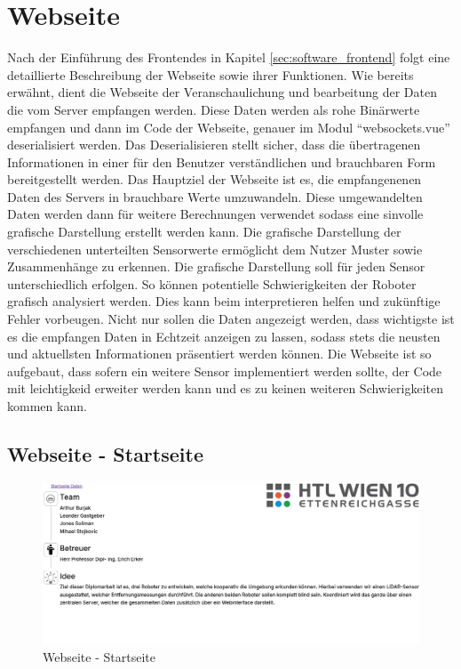 \section{Webseite}
\label{subsec:frontend_Webseite}
Nach der Einführung des Frontendes in Kapitel \ref{sec:software_frontend} folgt eine detaillierte
Beschreibung der Webseite sowie ihrer Funktionen. 
%
Wie bereits erwähnt, dient die Webseite der Veranschaulichung 
und bearbeitung der Daten die vom Server empfangen werden. 
%
Diese Daten werden als rohe Binärwerte empfangen und dann im Code der Webseite,
genauer im Modul ``websockets.vue'' deserialisiert werden. 
Das Deserialisieren stellt sicher, dass die übertragenen Informationen in einer für den Benutzer 
verständlichen und brauchbaren Form bereitgestellt werden. 
%
Das Hauptziel der Webseite ist es, die empfangenenen Daten des Servers in brauchbare Werte umzuwandeln. 
Diese umgewandelten Daten werden dann für weitere Berechnungen verwendet sodass eine sinvolle grafische Darstellung
erstellt werden kann.
%
Die grafische Darstellung der verschiedenen unterteilten Sensorwerte ermöglicht dem Nutzer Muster sowie 
Zusammenhänge zu erkennen. 
%
Die grafische Darstellung soll für jeden Sensor unterschiedlich erfolgen. So können potentielle Schwierigkeiten 
der Roboter grafisch analysiert werden. Dies kann beim interpretieren helfen und zukünftige Fehler vorbeugen. 
%
Nicht nur sollen die Daten angezeigt werden, dass wichtigste ist es die empfangen Daten 
in Echtzeit anzeigen zu lassen, sodass stets die neusten und aktuellsten Informationen präsentiert werden können.
%
Die Webseite ist so aufgebaut, dass sofern ein weitere Sensor implementiert werden sollte, 
der Code mit leichtigkeid erweiter werden kann und es zu keinen weiteren Schwierigkeiten kommen kann.  

\subsection{Webseite - Startseite}
\label{subsubsec:Webseite_Startseite}

\begin{figure}[H]
  \includegraphics[width=\textwidth, center]{img/Webseite_Startseite.png}
  \caption{Webseite - Startseite}
  \label{fig:Webseite_Startseite}
\end{figure}

